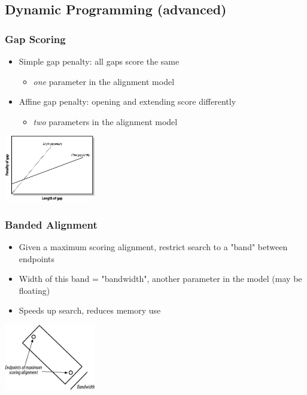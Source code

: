%

\subsection{Dynamic Programming (advanced)}
\begin{frame}
  \frametitle{Gap Scoring}
  \begin{itemize}
    \item Simple gap penalty: all gaps score the same
    \begin{itemize}
      \item \emph{one} parameter in the alignment model
    \end{itemize}
    \item Affine gap penalty: opening and extending score differently
    \begin{itemize}
      \item \emph{two} parameters in the alignment model
    \end{itemize}
  \end{itemize}
  \begin{center}
    \includegraphics[width=0.3\textwidth]{images/gap_scores} 
  \end{center}
\end{frame}  
   
\begin{frame}
  \frametitle{Banded Alignment}
  \begin{itemize}
    \item Given a maximum scoring alignment, restrict search to a "band" between endpoints
    \item Width of this band = "bandwidth", another parameter in the model (may be floating)
    \item Speeds up search, reduces memory use
  \end{itemize}
  \begin{center}
    \includegraphics[width=0.3\textwidth]{images/banded} 
  \end{center}
\end{frame}     